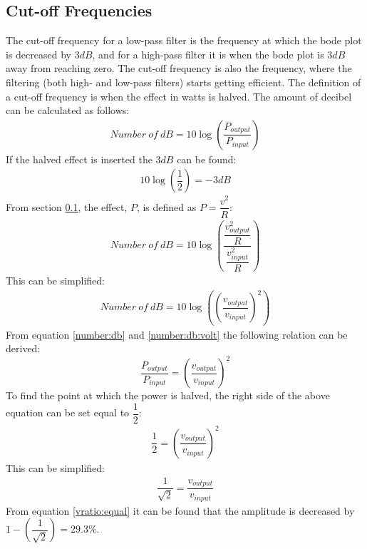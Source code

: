 \subsection{Cut-off Frequencies}
The cut-off frequency for a low-pass filter is the frequency at which the bode plot is decreased by $3dB$, and for a high-pass filter it is when the bode plot is $3dB$ away from reaching zero. The cut-off frequency is also the frequency, where the filtering (both high- and low-pass filters) starts getting efficient. The definition of a cut-off frequency is when the effect in watts is halved. The amount of decibel can be calculated as follows: \cite[p. 596-597]{bcircuit}
\begin{align} \label{number:db}
Number \ of \ dB = 10 \log \left(\dfrac{P_{output}}{P_{input}} \right)
\end{align}
If the halved effect is inserted the $3dB$ can be found:
\begin{align*} 
10 \log \left(\dfrac{1}{2} \right) = -3 dB
\end{align*}
From section \ref{}, the effect, $P$, is defined as $P=\dfrac{v^2}{R}$:
\begin{align*}
Number \ of \ dB = 10 \log \left(\dfrac{\dfrac{v_{output}^2}{R}}{\dfrac{v_{input}^2}{R}} \right)
\end{align*}
This can be simplified:
\begin{align} \label{number:db:volt}
Number \ of \ dB = 10 \log \left(\left(\dfrac{v_{output}}{v_{input}} \right)^2\right)
\end{align}
From equation \eqref{number:db} and \eqref{number:db:volt} the following relation can be derived: $$\dfrac{P_{output}}{P_{input}}= \left(\dfrac{v_{output}}{v_{input}} \right)^2$$ To find the point at which the power is halved, the right side of the above equation can be set equal to $\dfrac{1}{2}$:
\begin{align*}
\dfrac{1}{2}= \left(\dfrac{v_{output}}{v_{input}} \right)^2
\end{align*}
This can be simplified:
\begin{align} \label{eq:v_ratio}
\dfrac{1}{\sqrt{2}}= \dfrac{v_{output}}{v_{input}}
\end{align}
From equation \eqref{vratio:equal} it can be found that the amplitude is decreased by $1-\left(\dfrac{1}{\sqrt{2}} \right) = 29.3\%$.

